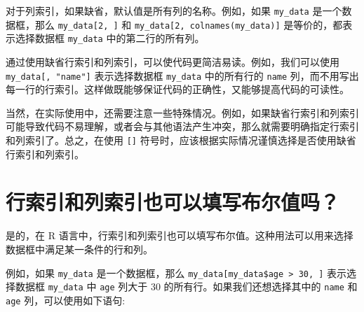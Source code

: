 \documentclass[
  letterpaper,
  DIV=11,
  numbers=noendperiod]{scrreprt}
\newenvironment{Shaded}{\begin{snugshade}}{\end{snugshade}}
\newcommand{\AttributeTok}[1]{\textcolor[rgb]{0.40,0.45,0.13}{#1}}
\newcommand{\DecValTok}[1]{\textcolor[rgb]{0.68,0.00,0.00}{#1}}
\newcommand{\FunctionTok}[1]{\textcolor[rgb]{0.28,0.35,0.67}{#1}}
\newcommand{\NormalTok}[1]{\textcolor[rgb]{0.00,0.23,0.31}{#1}}
\newcommand{\OtherTok}[1]{\textcolor[rgb]{0.00,0.23,0.31}{#1}}
\newcommand{\SpecialCharTok}[1]{\textcolor[rgb]{0.37,0.37,0.37}{#1}}
\newcommand{\StringTok}[1]{\textcolor[rgb]{0.13,0.47,0.30}{#1}}
\begin{document}
对于列索引，如果缺省，默认值是所有列的名称。例如，如果 \texttt{my\_data}
是一个数据框，那么 \texttt{my\_data{[}2,\ {]}} 和
\texttt{my\_data{[}2,\ colnames(my\_data){]}} 是等价的，都表示选择数据框
\texttt{my\_data} 中的第二行的所有列。

通过使用缺省行索引和列索引，可以使代码更简洁易读。例如，我们可以使用
\texttt{my\_data{[},\ "name"{]}} 表示选择数据框 \texttt{my\_data}
中的所有行的 \texttt{name}
列，而不用写出每一行的行索引。这样做既能够保证代码的正确性，又能够提高代码的可读性。

当然，在实际使用中，还需要注意一些特殊情况。例如，如果缺省行索引和列索引可能导致代码不易理解，或者会与其他语法产生冲突，那么就需要明确指定行索引和列索引了。总之，在使用
\texttt{{[}{]}}
符号时，应该根据实际情况谨慎选择是否使用缺省行索引和列索引。

\hypertarget{ux884cux7d22ux5f15ux548cux5217ux7d22ux5f15ux4e5fux53efux4ee5ux586bux5199ux5e03ux5c14ux503cux5417}{%
\section{行索引和列索引也可以填写布尔值吗？}\label{ux884cux7d22ux5f15ux548cux5217ux7d22ux5f15ux4e5fux53efux4ee5ux586bux5199ux5e03ux5c14ux503cux5417}}

是的，在 R
语言中，行索引和列索引也可以填写布尔值。这种用法可以用来选择数据框中满足某一条件的行和列。

例如，如果 \texttt{my\_data} 是一个数据框，那么
\texttt{my\_data{[}my\_data\$age\ \textgreater{}\ 30,\ {]}}
表示选择数据框 \texttt{my\_data} 中 \texttt{age} 列大于 30
的所有行。如果我们还想选择其中的 \texttt{name} 和 \texttt{age}
列，可以使用如下语句:

\begin{Shaded}
\end{Shaded}
\end{document}
